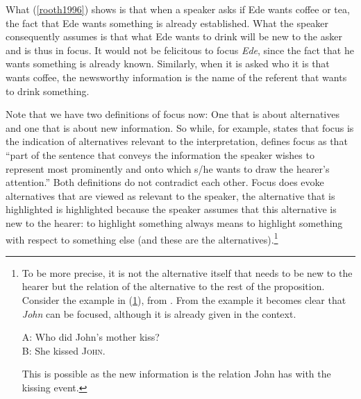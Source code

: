 \begin{exe}
\ex\label{rooth1996}
{}
\end{exe}

\noindent What (\ref{rooth1996}) shows is that when a speaker asks if Ede wants coffee or tea, the fact that Ede wants something is already established. What the speaker consequently assumes is that what Ede wants to drink will be new to the asker and is thus in focus. It would not be felicitous to focus \textit{Ede}, since the fact that he wants something is already known. Similarly, when it is asked who it is that wants coffee, the newsworthy information is the name of the referent that wants to drink something.

Note that we have two definitions of focus now: One that is about alternatives and one that is about new information. So while, for example, \citet[18]{krifka2007basic} states that focus is the indication of alternatives relevant to the interpretation, \citet[1876]{hinterwimmer2011formation} defines focus as that ``part of the sentence that conveys the information the speaker wishes to represent most prominently and onto which s/he wants to draw the hearer's attention.'' Both definitions do not contradict each other. Focus does evoke alternatives that are viewed as relevant to the speaker, the alternative that is highlighted is highlighted because the speaker assumes that this alternative is new to the hearer: to highlight something always means to highlight something with respect to something else (and these are the alternatives).\footnote{To be more precise, it is not the alternative itself that needs to be new to the hearer but the relation of the alternative to the rest of the proposition. Consider the example in (\ref{kissmotherrelation}), from \citet[55]{rochemont2016givenness}. From the example it becomes clear that \textit{John} can be focused, although it is already given in the context.

\ea A: Who did John's mother kiss? \\
B: She kissed \textsc{John}. \label{kissmotherrelation}
\z

\noindent This is possible as the new information is the relation John has with the kissing event.}


